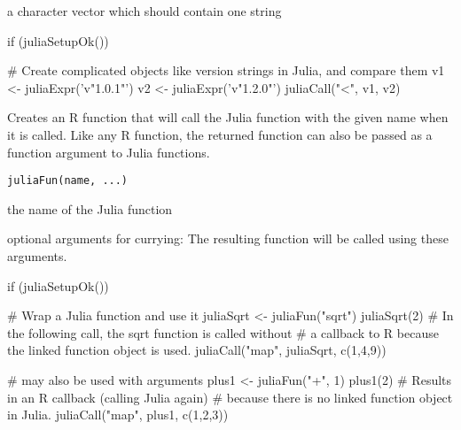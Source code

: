 %
\begin{Arguments}
\begin{ldescription}
\item[\code{expr}] a character vector which should contain one string
\end{ldescription}
\end{Arguments}
%
\begin{Examples}
\begin{ExampleCode}
if (juliaSetupOk()) {

   # Create complicated objects like version strings in Julia, and compare them
   v1 <- juliaExpr('v"1.0.1"')
   v2 <- juliaExpr('v"1.2.0"')
   juliaCall("<", v1, v2)

}


\end{ExampleCode}
\end{Examples}
%
\begin{Description}\relax
Creates an R function that will call the Julia function with the given name
when it is called. Like any R function, the returned function can
also be passed as a function argument to Julia functions.
\end{Description}
%
\begin{Usage}
\begin{verbatim}
juliaFun(name, ...)
\end{verbatim}
\end{Usage}
%
\begin{Arguments}
\begin{ldescription}
\item[\code{name}] the name of the Julia function

\item[\code{...}] optional arguments for currying:
The resulting function will be called using these arguments.
\end{ldescription}
\end{Arguments}
%
\begin{Examples}
\begin{ExampleCode}
if (juliaSetupOk()) {

   # Wrap a Julia function and use it
   juliaSqrt <- juliaFun("sqrt")
   juliaSqrt(2)
   # In the following call, the sqrt function is called without
   # a callback to R because the linked function object is used.
   juliaCall("map", juliaSqrt, c(1,4,9))

   # may also be used with arguments
   plus1 <- juliaFun("+", 1)
   plus1(2)
   # Results in an R callback (calling Julia again)
   # because there is no linked function object in Julia.
   juliaCall("map", plus1, c(1,2,3))

}


\end{ExampleCode}
\end{Examples}
